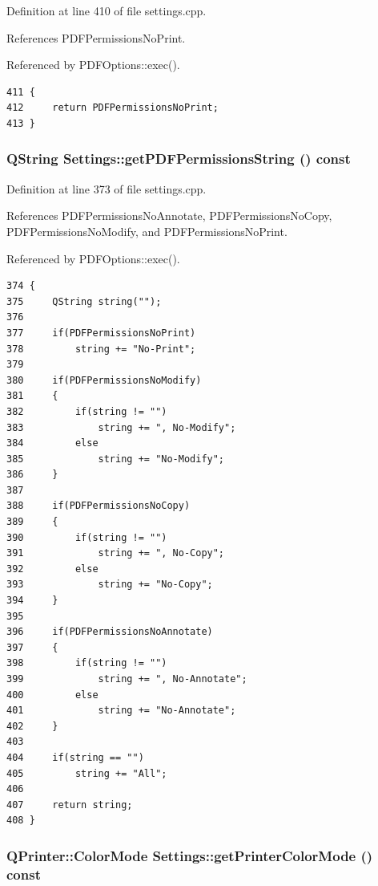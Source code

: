 Definition at line 410 of file settings.cpp.

References PDFPermissions\-No\-Print.

Referenced by PDFOptions::exec().

\footnotesize\begin{verbatim}411 {
412     return PDFPermissionsNoPrint;
413 }
\end{verbatim}\normalsize 


\hypertarget{classSettings_a49}{
\subsubsection[getPDFPermissionsString]{\setlength{\rightskip}{0pt plus 5cm}QString Settings::get\-PDFPermissions\-String () const}}
\label{classSettings_a49}


Definition at line 373 of file settings.cpp.

References PDFPermissions\-No\-Annotate, PDFPermissions\-No\-Copy, PDFPermissions\-No\-Modify, and PDFPermissions\-No\-Print.

Referenced by PDFOptions::exec().

\footnotesize\begin{verbatim}374 {
375     QString string("");
376 
377     if(PDFPermissionsNoPrint)
378         string += "No-Print";
379     
380     if(PDFPermissionsNoModify)
381     {
382         if(string != "")
383             string += ", No-Modify";
384         else
385             string += "No-Modify";
386     }
387 
388     if(PDFPermissionsNoCopy)
389     {
390         if(string != "")
391             string += ", No-Copy";
392         else
393             string += "No-Copy";
394     }
395 
396     if(PDFPermissionsNoAnnotate)
397     {
398         if(string != "")
399             string += ", No-Annotate";
400         else
401             string += "No-Annotate";
402     }
403 
404     if(string == "")
405         string += "All";
406 
407     return string;
408 }
\end{verbatim}\normalsize 


\hypertarget{classSettings_a33}{
\subsubsection[getPrinterColorMode]{\setlength{\rightskip}{0pt plus 5cm}QPrinter::Color\-Mode Settings::get\-Printer\-Color\-Mode () const}}
\label{classSettings_a33}


